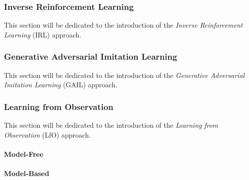 \subsubsection{Inverse Reinforcement Learning}
This section will be dedicated to the introduction of the \textit{Inverse Reinforcement Learning} (IRL) approach. 

\subsubsection{Generative Adversarial Imitation Learning}
This section will be dedicated to the introduction of the \textit{Generative Adversarial Imitation Learning} (GAIL) approach. 

\subsubsection{Learning from Observation}
This section will be dedicated to the introduction of the \textit{Learning from Observation} (LfO) approach. 
\paragraph{Model-Free}
\paragraph{Model-Based}